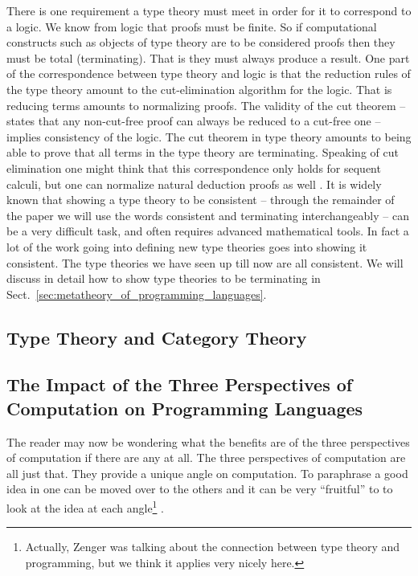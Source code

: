 \documentclass{article}
\begin{document}
There is one requirement a type theory must meet in order for it to
correspond to a logic.  We know from logic that proofs must be finite.
So if computational constructs such as objects of type theory are to
be considered proofs then they must be total (terminating).  That is
they must always produce a result.  One part of the correspondence
between type theory and logic is that the reduction rules of the type
theory amount to the cut-elimination algorithm for the logic.  That is
reducing terms amounts to normalizing proofs.  The validity of the cut
theorem -- states that any non-cut-free proof can always be reduced to
a cut-free one -- implies consistency of the logic.  The cut theorem
in type theory amounts to being able to prove that all terms in the
type theory are terminating.  Speaking of cut elimination one might
think that this correspondence only holds for sequent calculi, but one
can normalize natural deduction proofs as well \cite{Prawitz:1965}.
It is widely known that showing a type theory to be consistent --
through the remainder of the paper we will use the words consistent
and terminating interchangeably -- can be a very difficult task, and
often requires advanced mathematical tools.  In fact a lot of the work
going into defining new type theories goes into showing it consistent.
The type theories we have seen up till now are all consistent.  We
will discuss in detail how to show type theories to be terminating in
Sect.~\ref{sec:metatheory_of_programming_languages}.

\subsection{Type Theory and Category Theory}
\label{subsec:tt_ct}


\subsection{The Impact of the Three Perspectives of Computation on Programming Languages}
\label{subsec:three_perspectives_programming_languages}
The reader may now be wondering what the benefits are of the three
perspectives of computation if there are any at all.  The three
perspectives of computation are all just that.  They provide a unique
angle on computation. To paraphrase \cite{Zenger:1997} a good idea in
one can be moved over to the others and it can be very ``fruitful'' to
to look at the idea at each angle\footnote{Actually, Zenger was
  talking about the connection between type theory and programming,
  but we think it applies very nicely here.} .
\end{document}

